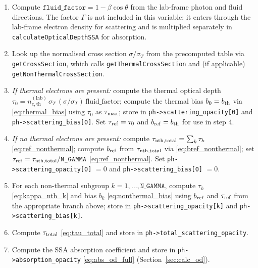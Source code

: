 \documentclass[12pt,a4paper]{article}
\newcommand{\code}[1]{\texttt{#1}}
\begin{document}
\begin{enumerate}[leftmargin=2em]
	\item Compute
	\(\code{fluid\_factor}=1-\beta\cos\theta\)
	from the lab-frame photon and fluid directions. The factor \(\Gamma\)
	is not included in this variable: it enters through the lab-frame
	electron density for scattering and is multiplied separately in
	\code{calculateOpticalDepthSSA} for absorption.
	
	\item Look up the normalised cross section $\sigma/\sigma_T$ from
	the precomputed table via \code{getCrossSection}, which calls
	\code{getThermalCrossSection} and (if applicable)
	\code{getNonThermalCrossSection}.
	
	\item \textit{If thermal electrons are present:} compute the thermal
	optical depth $\tau_0 = n_{e,\mathrm{th}}^{(\mathrm{lab})}\,\sigma_T\,
	(\sigma/\sigma_T)\,\mathrm{fluid\_factor}$; compute the thermal bias
	$b_0 = b_{\rm th}$ via \eqref{eq:thermal_bias} using $\tau_0$ as
	$\tau_{\rm max}$; store in \code{ph->scattering\_opacity[0]} and
	\code{ph->scattering\_bias[0]}.  Set $\tau_{\rm ref} = \tau_0$ and
	$b_{\rm ref} = b_{\rm th}$ for use in step 4.
	
	\item \textit{If no thermal electrons are present:} compute
	$\tau_{\rm nth,total} = \sum_k \tau_k$ \eqref{eq:ref_nonthermal};
	compute $b_{\rm ref}$ from $\tau_{\rm nth,total}$ via
	\eqref{eq:bref_nonthermal}; set $\tau_{\rm ref} =
	\tau_{\rm nth,total}/\code{N\_GAMMA}$ \eqref{eq:ref_nonthermal}.
	Set \code{ph->scattering\_opacity[0]} $= 0$ and
	\code{ph->scattering\_bias[0]} $= 0$.
	
	\item For each non-thermal subgroup $k = 1,\ldots,\code{N\_GAMMA}$,
	compute $\tau_k$ \eqref{eq:kappa_nth_k} and bias $b_k$
	\eqref{eq:nonthermal_bias} using $b_{\rm ref}$ and $\tau_{\rm ref}$
	from the appropriate branch above; store in
	\code{ph->scattering\_opacity[k]} and \code{ph->scattering\_bias[k]}.
	
	\item Compute $\tau_{\rm total}$ \eqref{eq:tau_total} and store in
	\code{ph->total\_scattering\_opacity}.
	
	\item Compute the SSA absorption coefficient and store in
	\code{ph->absorption\_opacity} \eqref{eq:abs_od_full}
	(Section~\ref{sec:calc_od}).
\end{enumerate}
\end{document}
